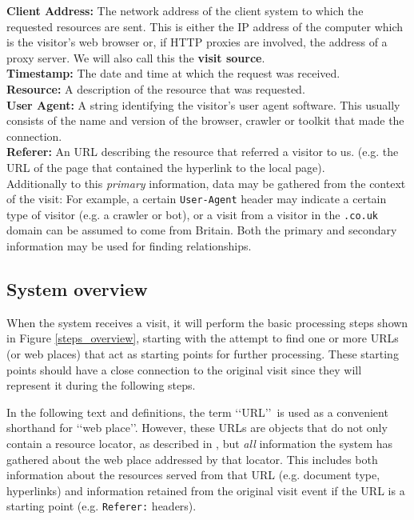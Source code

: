 \documentclass[a4paper,twoside]{danarticle}
\theoremstyle{remark}
\begin{document}
    \textbf{Client Address:} The network address of the client system to which 
    the requested resources are sent. This is either the IP address of the 
    computer which is the visitor's web browser or, if HTTP proxies are 
    involved, the address of a proxy server. We will also call this the 
    \textbf{visit source}.
    \\
    
    \textbf{Timestamp:} The date and time at which the request was received.
    \\
    
    \textbf{Resource:} A description of the resource that was requested.
    \\
    
    \textbf{User Agent:} A string identifying the visitor's user agent 
    software. This usually consists of the name and version of the browser, 
    crawler or toolkit that made the connection.
    \\
    
    \textbf{Referer:} An URL describing the resource that referred a visitor to
    us. (e.g. the URL of the page that contained the hyperlink to the 
    local page).
    \\
    
    Additionally to
    this \textit{primary} information, data may be gathered from the
    context of the visit: For example, a certain \verb$User-Agent$ header 
    may indicate a certain type of visitor (e.g. a crawler or bot), or a visit
    from a visitor in the \verb$.co.uk$ domain can be assumed to come from
    Britain. Both the primary and secondary information may be used for finding
    relationships.
    \subsection{System overview}
      When the system receives a visit, it will perform the basic processing
      steps shown in Figure \ref{steps_overview}, starting with the 
      attempt to find one or 
      more URLs (or web places) that act as starting points for further 
      processing. These 
      starting points should have a close connection to the original visit since 
      they will represent it during the following steps.
      
      In the following text and definitions, the term \lq\lq URL\rq\rq\ 
      is used as a convenient shorthand for \lq\lq web place\rq\rq . However, 
      these URLs are objects that 
      do not only contain a resource locator, as described 
      in \cite{url}, but \emph{all} information the system has gathered about 
      the web place addressed by that locator. This includes both information 
      about  the resources served from that URL (e.g. document type, hyperlinks) 
      and information retained from the original visit event if the URL is a 
      starting point (e.g. \verb$Referer:$ headers).
      
\end{document}
